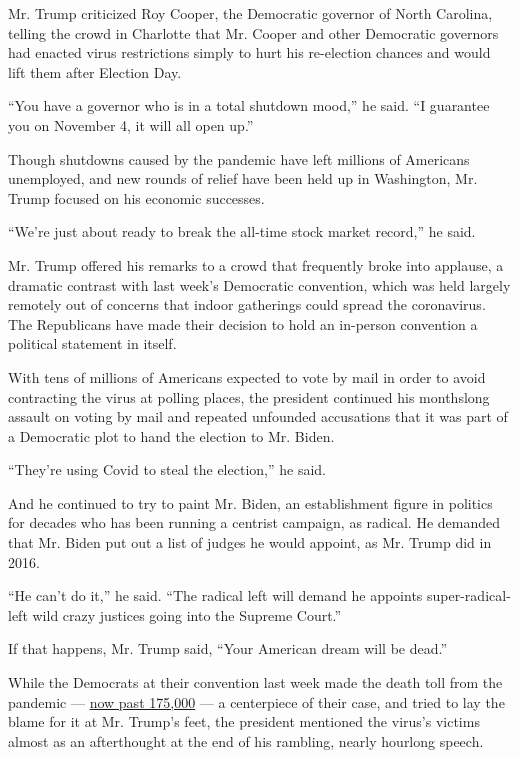 Mr. Trump criticized Roy Cooper, the Democratic governor of North
Carolina, telling the crowd in Charlotte that Mr. Cooper and other
Democratic governors had enacted virus restrictions simply to hurt his
re-election chances and would lift them after Election Day.

``You have a governor who is in a total shutdown mood,'' he said. ``I
guarantee you on November 4, it will all open up.''

Though shutdowns caused by the pandemic have left millions of Americans
unemployed, and new rounds of relief have been held up in Washington,
Mr. Trump focused on his economic successes.

``We're just about ready to break the all-time stock market record,'' he
said.

Mr. Trump offered his remarks to a crowd that frequently broke into
applause, a dramatic contrast with last week's Democratic convention,
which was held largely remotely out of concerns that indoor gatherings
could spread the coronavirus. The Republicans have made their decision
to hold an in-person convention a political statement in itself.

With tens of millions of Americans expected to vote by mail in order to
avoid contracting the virus at polling places, the president continued
his monthslong assault on voting by mail and repeated unfounded
accusations that it was part of a Democratic plot to hand the election
to Mr. Biden.

``They're using Covid to steal the election,'' he said.

And he continued to try to paint Mr. Biden, an establishment figure in
politics for decades who has been running a centrist campaign, as
radical. He demanded that Mr. Biden put out a list of judges he would
appoint, as Mr. Trump did in 2016.

``He can't do it,'' he said. ``The radical left will demand he appoints
super-radical-left wild crazy justices going into the Supreme Court.''

If that happens, Mr. Trump said, ``Your American dream will be dead.''

While the Democrats at their convention last week made the death toll
from the pandemic ---
\href{https://www.nytimes3xbfgragh.onion/interactive/2020/us/coronavirus-us-cases.html?action=click\&pgtype=Article\&state=default\&module=styln-coronavirus\&variant=show\&region=TOP_BANNER\&context=storylines_menu}{now
past 175,000} --- a centerpiece of their case, and tried to lay the
blame for it at Mr. Trump's feet, the president mentioned the virus's
victims almost as an afterthought at the end of his rambling, nearly
hourlong speech.

